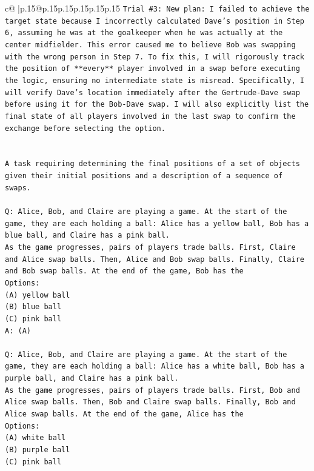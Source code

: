\documentclass{article}
\begin{document}
{\begin{supertabular}{c@{$\;$}|p{.15\linewidth}@{}p{.15\linewidth}p{.15\linewidth}p{.15\linewidth}p{.15\linewidth}p{.15\linewidth}}
{{{\texttt{Trial \#3: New plan: I failed to achieve the target state because I incorrectly calculated Dave's position in Step 6, assuming he was at the goalkeeper when he was actually at the center midfielder. This error caused me to believe Bob was swapping with the wrong person in Step 7. To fix this, I will rigorously track the position of **every** player involved in a swap before executing the logic, ensuring no intermediate state is misread. Specifically, I will verify Dave's location immediately after the Gertrude{-}Dave swap before using it for the Bob{-}Dave swap. I will also explicitly list the final state of all players involved in the last swap to confirm the exchange before selecting the option.} \\
\\ 
\\ 
\texttt{A task requiring determining the final positions of a set of objects given their initial positions and a description of a sequence of swaps.} \\
\\ 
\texttt{Q: Alice, Bob, and Claire are playing a game. At the start of the game, they are each holding a ball: Alice has a yellow ball, Bob has a blue ball, and Claire has a pink ball.} \\
\texttt{As the game progresses, pairs of players trade balls. First, Claire and Alice swap balls. Then, Alice and Bob swap balls. Finally, Claire and Bob swap balls. At the end of the game, Bob has the} \\
\texttt{Options:} \\
\texttt{(A) yellow ball} \\
\texttt{(B) blue ball} \\
\texttt{(C) pink ball} \\
\texttt{A: (A)} \\
\\ 
\texttt{Q: Alice, Bob, and Claire are playing a game. At the start of the game, they are each holding a ball: Alice has a white ball, Bob has a purple ball, and Claire has a pink ball.} \\
\texttt{As the game progresses, pairs of players trade balls. First, Bob and Alice swap balls. Then, Bob and Claire swap balls. Finally, Bob and Alice swap balls. At the end of the game, Alice has the} \\
\texttt{Options:} \\
\texttt{(A) white ball} \\
\texttt{(B) purple ball} \\
\texttt{(C) pink ball} \\
}}}
\end{supertabular}}
\end{document}
